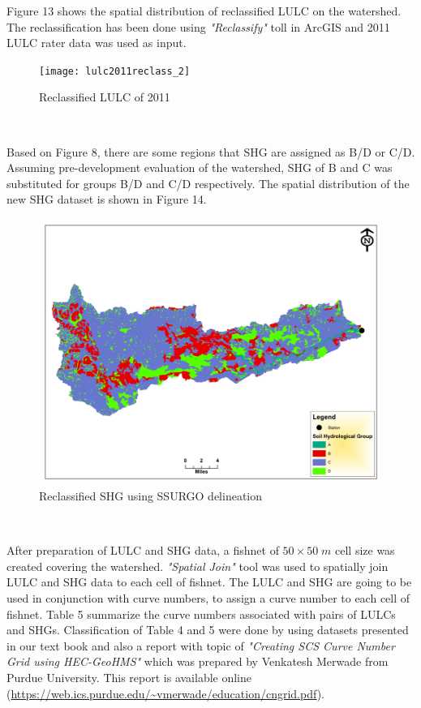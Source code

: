 \documentclass[letterpaper,12pt]{article}
\begin{document}
\begin{enumerate}
	Figure 13 shows the spatial distribution of reclassified LULC on the watershed. The reclassification has been done using \emph{"Reclassify"} toll in ArcGIS and 2011 LULC rater data was used as input.
		
	\begin{figure}[H]
		\begin{center}
			\texttt{[image: lulc2011reclass\_2]}
		\end{center}
		\caption{Reclassified LULC of 2011}\label{lulcmod}
	\end{figure}~

	Based on Figure 8, there are some regions that SHG are assigned as B/D or C/D. Assuming pre-development evaluation of the watershed, SHG of B and C was substituted for groups B/D and C/D respectively. The spatial distribution of the new SHG dataset is shown in Figure 14.  
	
	\begin{figure}[H]
		\begin{center}
			\includegraphics[width=16cm]{SHG(modif)_2}
		\end{center}
		\caption{Reclassified SHG using SSURGO delineation}\label{SHGmod}
	\end{figure}~
	
	After preparation of LULC and SHG data, a fishnet of $50\times 50\;m$ cell size was created covering the watershed. \emph{"Spatial Join"} tool was used to spatially join LULC and SHG data to each cell of fishnet. The LULC and SHG are going to be used in conjunction with curve numbers, to assign a curve number to each cell of fishnet. Table 5 summarize the curve numbers associated with pairs of LULCs and SHGs. Classification of Table 4 and 5 were done by using datasets presented in our text book and also a report with topic of \emph{"Creating SCS Curve Number Grid using HEC-GeoHMS"} which was prepared by Venkatesh Merwade from Purdue University. This report is available online (\url{https://web.ics.purdue.edu/~vmerwade/education/cngrid.pdf}).
	

\end{enumerate}
\end{document}
